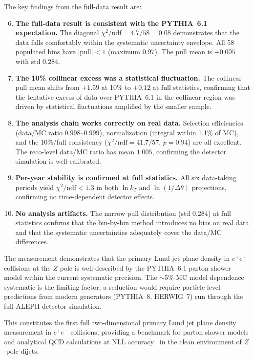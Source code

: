\documentclass[11pt,a4paper]{article}
\begin{document}
The key findings from the full-data result are:
\begin{enumerate}
\setcounter{enumi}{5}
\item \textbf{The full-data result is consistent with the PYTHIA~6.1
  expectation.}  The diagonal $\chi^2/\text{ndf} = 4.7/58 = 0.08$
  demonstrates that the data falls comfortably within the systematic
  uncertainty envelope.  All 58 populated bins have
  $|\text{pull}| < 1$ (maximum $0.97$).  The pull mean is $+0.005$
  with std $0.284$.
\item \textbf{The 10\% collinear excess was a statistical
  fluctuation.}  The collinear pull mean shifts from $+1.59$ at 10\%
  to $+0.12$ at full statistics, confirming that the tentative excess
  of data over PYTHIA~6.1 in the collinear region was driven by
  statistical fluctuations amplified by the smaller sample.
\item \textbf{The analysis chain works correctly on real data.}
  Selection efficiencies (data/MC ratio $0.998$--$0.999$),
  normalization (integral within 1.1\% of MC), and the 10\%/full
  consistency ($\chi^2/\text{ndf} = 41.7/57$, $p = 0.94$) are all
  excellent.  The reco-level data/MC ratio has mean $1.005$, confirming
  the detector simulation is well-calibrated.
\item \textbf{Per-year stability is confirmed at full statistics.}  All
  six data-taking periods yield $\chi^2/\text{ndf} < 1.3$ in both
  $\ln k_T$ and $\ln(1/\Delta\theta)$ projections, confirming no
  time-dependent detector effects.
\item \textbf{No analysis artifacts.}  The narrow pull distribution
  (std $0.284$) at full statistics confirms that the bin-by-bin method
  introduces no bias on real data and that the systematic uncertainties
  adequately cover the data/MC differences.
\end{enumerate}

The measurement demonstrates that the primary Lund jet plane density in
$e^+e^-$ collisions at the $Z$ pole is well-described by the PYTHIA~6.1
parton shower model within the current systematic precision.  The
$\sim\!5\%$ MC model dependence systematic is the limiting factor; a
reduction would require particle-level predictions from modern generators
(PYTHIA~8, HERWIG~7) run through the full ALEPH detector simulation.

This constitutes the first full two-dimensional primary Lund jet plane
density measurement in $e^+e^-$ collisions, providing a benchmark for
parton shower models and analytical QCD calculations at NLL
accuracy~\cite{Lifson:2020gua} in the clean environment of $Z$-pole
dijets.
\end{document}

